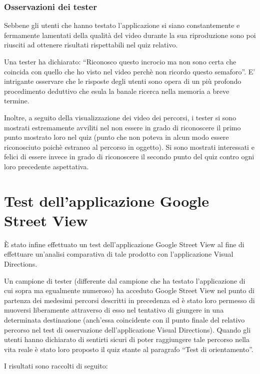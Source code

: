 \documentclass[12pt,a4paper,openright, notitlepage]{report}
\begin{document}
\subsubsection{Osservazioni dei tester}

Sebbene gli utenti che hanno testato l’applicazione si siano constantemente e fermamente lamentati della qualità del video durante la sua riproduzione sono poi riusciti ad ottenere risultati rispettabili nel quiz relativo. 

Una tester ha dichiarato: “Riconosco questo incrocio ma non sono certa che coincida con quello che ho visto nel video perchè non ricordo questo semaforo”. E’ intrigante osservare che le risposte degli utenti sono opera di un più profondo procedimento deduttivo che esula la banale ricerca nella memoria a breve termine. 

Inoltre, a seguito della visualizzazione dei video dei percorsi, i tester si sono mostrati estremamente avviliti nel non essere in grado di riconoscere il primo punto mostrato loro nel quiz (punto che non poteva in alcun modo essere riconosciuto poichè estraneo al percorso in oggetto). Si sono mostrati interessati e felici di essere invece in grado di riconoscere il secondo punto del quiz contro ogni loro precedente aspettativa.

\section{Test dell’applicazione Google Street View}

È stato infine effettuato un test dell’applicazione Google Street View al fine di effettuare un’analisi comparativa di tale prodotto con l’applicazione Visual Directions.

Un campione di tester (differente dal campione che ha testato l’applicazione di cui sopra ma egualmente numeroso) ha acceduto Google Street View nel punto di partenza dei medesimi percorsi descritti in precedenza ed è stato loro permesso di muoversi liberamente attraverso di esso nel tentativo di giungere in una determinata destinazione (anch’essa coincidente con il punto finale del relativo percorso nel test di osservazione dell’applicazione Visual Directions). Quando gli utenti hanno dichiarato di sentirti sicuri di poter raggiungere tale percorso nella vita reale è stato loro proposto il quiz stante al paragrafo “Test di orientamento”.

I risultati sono raccolti di seguito:
\end{document}
